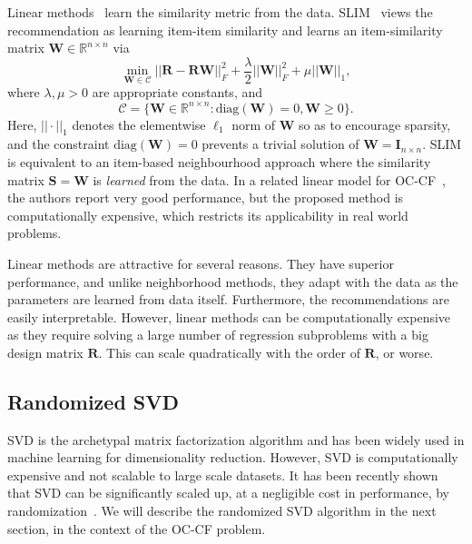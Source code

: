 \documentclass{article}
\newcommand{\citep}{\cite}
\newcommand{\id}{\mathbf{I}}
\newcommand{\Real}{\mathbb{R}}
\newcommand{\R}{\mathbf{R}}
\newcommand{\Sim}{\mathbf{S}}
\newcommand{\C}{\mathcal{C}}
\newcommand{\W}{\mathbf{W}}
\newcommand{\numItems}{n}
\begin{document}
Linear methods~\cite{Ning:2011, Sedhain:2016} learn the similarity metric from the data. SLIM~\citep{Ning:2011} views the recommendation as learning item-item similarity and learns an item-similarity matrix $\W \in \Real^{\numItems \times \numItems}$ via
\begin{equation}
\label{eqn:slim}
\min_{ \W \in \C } || \R - \R \W ||_F^2 + \frac{\lambda}{2} || \W ||_F^2 + \mu || \W ||_1,
\end{equation}
where $\lambda, \mu > 0$ are appropriate constants, and
\begin{equation}
\label{eqn:slim-constraint}
\C = \{ \W \in \Real^{\numItems \times \numItems} \colon \text{diag}( \W ) = 0, \W \geq 0 \}.
\end{equation}
Here, $|| \cdot ||_1$ denotes the elementwise $\ell_1$ norm of $\W$ so as to encourage sparsity, and the constraint $\text{diag}( \W ) = 0$ prevents a trivial solution of $\W = \id_{\numItems \times \numItems}$. SLIM is equivalent to an item-based neighbourhood approach where the similarity matrix $\Sim = \W$ is \emph{learned} from the data.
%
In a related linear model for OC-CF~\citep{Sedhain:2016}, the authors report very good performance, but the proposed method is computationally expensive, which restricts its applicability in real world problems.

Linear methods are attractive for several reasons. They have superior performance, and unlike neighborhood methods, they adapt with the data as the parameters are learned from data itself. Furthermore, the recommendations are easily interpretable. However, linear methods can be computationally expensive as they require solving a large number of regression subproblems with a big design matrix $\R$. This can scale quadratically with the order of $\R$, or worse.


\subsection{Randomized SVD}
SVD is the archetypal matrix factorization algorithm and has been widely used in machine learning for dimensionality reduction. However, SVD is computationally expensive and not scalable to large scale datasets. It has been recently shown that SVD can be significantly scaled up, at a negligible cost in performance, by randomization~\citep{halko2011}. We will describe the randomized SVD algorithm in the next section, in the context of the OC-CF problem.
\end{document}

